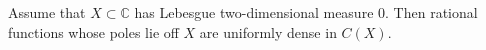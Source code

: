 
Assume that $X \subset \mathbb{C}$ has Lebesgue two-dimensional measure $0$. Then rational functions whose poles lie off $X$ are uniformly dense in $C(X)$.
